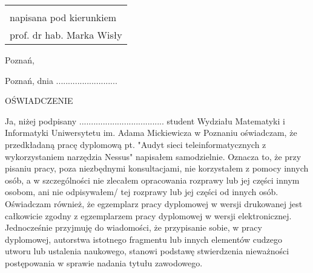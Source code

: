 \documentclass[11pt,a4paper,leqno]{article}
\newcommand{\totalemptypage}{\newpage\thispagestyle{empty}\null\newpage}
\begin{document}
\begin{titlepage}
\begin{center}
\begin{flushleft}
		\end{flushleft}%
		
		\vspace{2.5cm plus 1.5fill}
		
		\begin{flushright}\large
			\begin{tabular}{l}
				{\small Praca magisterska \\
					\small napisana pod kierunkiem \\
					\small prof. dr hab. Marka Wisły 
				}
			\end{tabular}
		\end{flushright}
		
		\vspace{2cm plus .1fill}
		{Poznań,\par}
	\end{center}
\end{titlepage}%

\totalemptypage



\thispagestyle{empty}

\begin{flushright}
	Poznań, dnia ..........................
\end{flushright}

\vspace{1 cm}

\begin{center}
	{\large OŚWIADCZENIE}
\end{center}

\vspace{0.75 cm}

Ja, niżej podpisany .................................... student Wydziału Matematyki i Informatyki Uniwersytetu im. Adama Mickiewicza w Poznaniu oświadczam, że przedkładaną pracę dyplomową pt. "Audyt sieci teleinformatycznych z wykorzystaniem narzędzia Nessus" napisałem samodzielnie. Oznacza to, że przy pisaniu pracy, poza niezbędnymi konsultacjami, nie korzystałem z pomocy innych osób, a w szczególności nie zlecałem opracowania rozprawy lub jej części innym osobom, ani nie odpisywałem/ tej rozprawy lub jej części od innych osób.
Oświadczam również, że egzemplarz pracy dyplomowej w wersji drukowanej jest całkowicie zgodny z egzemplarzem pracy dyplomowej w wersji elektronicznej.
Jednocześnie przyjmuję do wiadomości, że przypisanie sobie, w pracy dyplomowej, autorstwa istotnego fragmentu lub innych elementów cudzego utworu lub ustalenia naukowego, stanowi podstawę stwierdzenia nieważności postępowania w sprawie nadania tytułu zawodowego.
\end{document}
